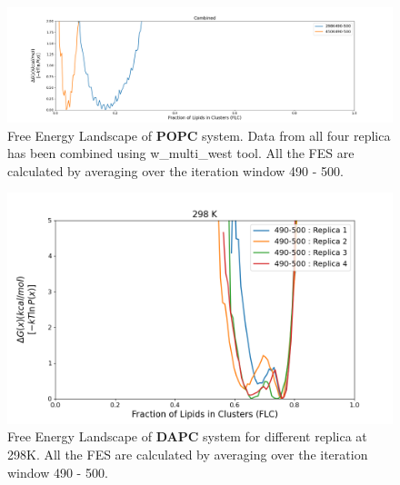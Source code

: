 \documentclass{biophys-new}
\begin{document}
\begin{figure}[hbt!]
\centering
\includegraphics[width=1.1\linewidth]{all_plots/ClusterLipids2Total/DPPC_POPC_CHOL/Average_POPC_MULTI__ClusterLipids2Total.png}
\caption{Free Energy Landscape of \textbf{POPC} system. Data from all four replica has been combined using w\_multi\_west tool. All the FES are calculated by averaging over the iteration window 490 - 500.}
\label{fig:view}

\end{figure}

\begin{figure}[hbt!]
\centering
\includegraphics[width=1.1\linewidth]{all_plots/ClusterLipids2Total/DPPC_DAPC_CHOL/298K/Average_DAPC_298_ClusterLipids2Total.png}
\caption{Free Energy Landscape of \textbf{DAPC} system for different replica at 298K. All the FES are calculated by averaging over the iteration window 490 - 500.}
\label{fig:view}

\end{figure}
\end{document}
